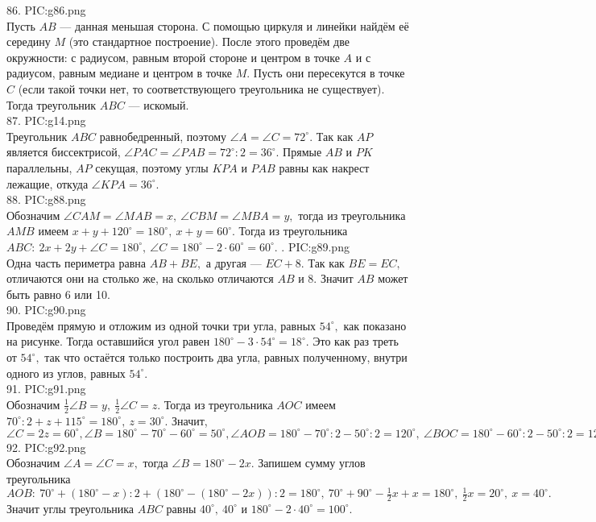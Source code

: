 86. {{PIC:g86.png}}\\
Пусть $AB$ --- данная меньшая сторона. С помощью циркуля и линейки найдём её середину $M$ (это стандартное построение). После этого проведём две окружности: с радиусом, равным второй стороне и центром в точке $A$ и с радиусом, равным медиане и центром в точке $M.$ Пусть они пересекутся в точке $C$ (если такой точки нет, то соответствующего треугольника не существует). Тогда треугольник $ABC$ --- искомый.\\
87. {{PIC:g14.png}}\\
Треугольник $ABC$ равнобедренный, поэтому $\angle A=\angle C =72^\circ.$ Так как $AP$ является биссектрисой, $\angle PAC=\angle PAB=72^\circ:2=36^\circ.$ Прямые $AB$ и $PK$ параллельны, $AP$ секущая, поэтому углы $KPA$ и $PAB$ равны как накрест лежащие, откуда $\angle KPA=36^\circ.$\\
88. {{PIC:g88.png}}\\
Обозначим $\angle CAM=\angle MAB=x,\ \angle CBM=\angle MBA=y,$ тогда из треугольника $AMB$ имеем $x+y+120^\circ=180^\circ,\ x+y=60^\circ.$ Тогда из треугольника $ABC:\ 2x+2y+\angle C=180^\circ,\ \angle C=180^\circ-2\cdot60^\circ=60^\circ.$\newpage
{}. {{PIC:g89.png}}\\
Одна часть периметра равна $AB+BE,$ а другая --- $EC+8.$ Так как $BE=EC,$ отличаются они на столько же, на сколько отличаются $AB$ и 8. Значит $AB$ может быть равно 6 или 10.\\
90. {{PIC:g90.png}}\\Проведём прямую и отложим из одной точки три угла, равных $54^\circ,$ как показано на рисунке. Тогда оставшийся угол равен $180^\circ-3\cdot54^\circ=18^\circ.$ Это как раз треть от $54^\circ,$ так что остаётся только построить два угла, равных полученному, внутри одного из углов, равных $54^\circ.$\\
91. {{PIC:g91.png}}\\
Обозначим $\frac{1}{2}\angle B=y,\ \frac{1}{2}\angle C=z.$ Тогда из треугольника $AOC$ имеем $70^\circ:2+z+115^\circ=180^\circ,\ z=30^\circ.$ Значит, $\angle C=2z=60^\circ, \angle B=180^\circ-70^\circ-60^\circ=50^\circ, \angle AOB=180^\circ-70^\circ:2-50^\circ:2=120^\circ,\ \angle BOC=180^\circ-60^\circ:2-50^\circ:2=125^\circ.$\\
92. {{PIC:g92.png}}\\
Обозначим $\angle A=\angle C=x,$ тогда $\angle B=180^\circ-2x.$ Запишем сумму углов треугольника $AOB:\ 70^\circ+(180^\circ-x):2+(180^\circ-(180^\circ-2x)):2=180^\circ,\ 70^\circ +90^\circ-\frac{1}{2}x+x=180^\circ,\ \frac{1}{2}x=20^\circ,\ x=40^\circ.$ Значит углы треугольника $ABC$ равны $40^\circ,\ 40^\circ$ и $180^\circ-2\cdot40^\circ=100^\circ.$\newpage\noindent
